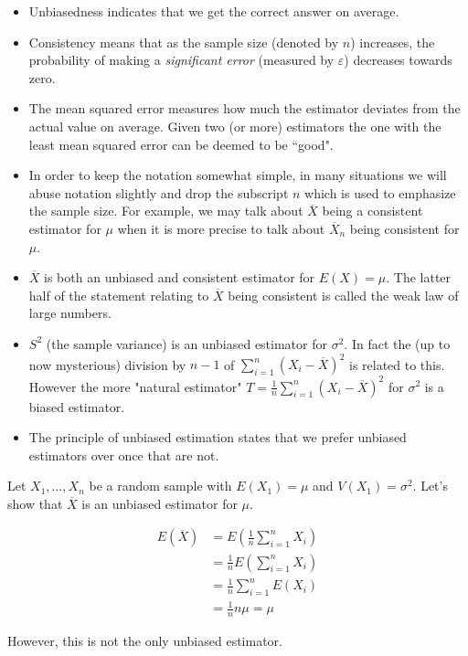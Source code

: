 \note
\begin{itemize}
    \item Unbiasedness indicates that we get the correct answer on average. 
    \item Consistency means that as the sample size (denoted by $n$) increases, the probability of making a \textit{significant error} (measured by $\varepsilon$) decreases towards zero.  
    \item The mean squared error measures how much the estimator deviates from the actual value on average. Given two (or more) estimators the one with the least mean squared error can be deemed to be ``good". 
    \item In order to keep the notation somewhat simple, in many situations we will abuse notation slightly and drop the subscript $n$ which is used to emphasize the sample size. For example, we may talk about $\overline{X}$ being a consistent estimator for $\mu$ when it is more precise to talk about $\overline{X}_n$ being consistent for $\mu$.  
    \item $\overline{X}$ is both an unbiased and consistent estimator for $E(X) = \mu$. The latter half of the statement relating to $\overline{X}$ being consistent is called the weak law of large numbers. 
    \item $S^2$ (the sample variance) is an unbiased estimator for $\sigma^2$. In fact the (up to now mysterious) division by $n-1$ of $\sum_{i=1}^n (X_i - \overline{X})^2$ is related to this. However the more "natural estimator" $
T = \frac{1}{n} \sum_{i=1}^n \left(X_i - \overline{X}\right)^2
$ for $\sigma^2$ is a biased estimator.
    \item The principle of unbiased estimation states that we prefer unbiased estimators over once that are not.
\end{itemize}

Let $X_1, \ldots, X_n$ be a random sample with $E(X_1) = \mu$ and $V(X_1) = \sigma^2$. Let's show that $\overline{X}$ is an unbiased estimator for $\mu$.

\begin{align*}
    E(\overline{X}) 
    &= E\left(\frac{1}{n} \sum_{i=1}^n X_i\right) \\
    &= \frac{1}{n} E\left( \sum_{i=1}^n X_i\right) \\
    &= \frac{1}{n} \sum_{i=1}^nE\left(  X_i\right) \\
    &= \frac{1}{n} n \mu = \mu
\end{align*}

However, this is not the only unbiased estimator. \\

